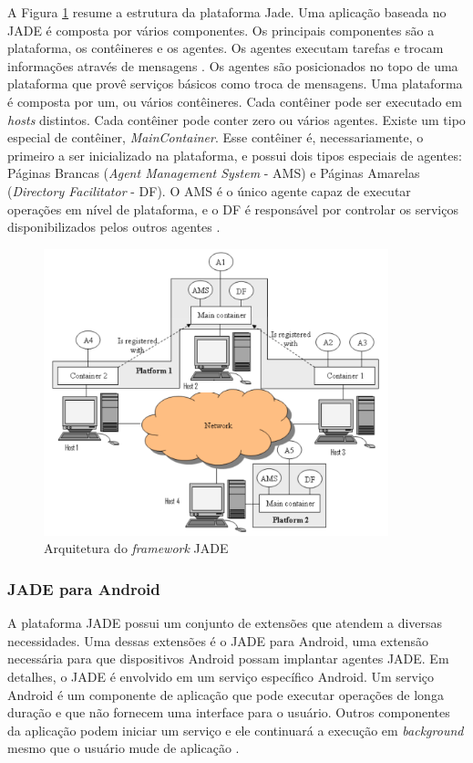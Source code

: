 A Figura \ref{figura:jade} resume a estrutura da plataforma Jade. Uma aplicação
baseada no JADE é composta por vários componentes. Os principais componentes são
a plataforma, os contêineres e os agentes. Os agentes executam tarefas e trocam
informações através de mensagens \cite{fabio2007}. Os agentes são posicionados
no topo de uma plataforma que provê serviços básicos como troca de mensagens.
Uma plataforma é composta por um, ou vários contêineres. Cada contêiner pode ser
executado em \textit{hosts} distintos. Cada contêiner pode conter zero ou vários
agentes. Existe um tipo especial de contêiner, \textit{MainContainer}. Esse
contêiner é, necessariamente, o primeiro a ser inicializado na plataforma, e
possui dois tipos especiais de agentes: Páginas Brancas (\textit{Agent
Management System} - AMS) e Páginas Amarelas (\textit{Directory Facilitator} -
DF). O AMS é o único agente capaz de executar operações em nível de plataforma,
e o DF é responsável por controlar os serviços disponibilizados pelos outros
agentes \cite{jade}.

\begin{figure}[h]
  \centering
  \includegraphics[width=10cm]{figuras/jade_architecture.png}
  \caption{Arquitetura do \textit{framework} JADE \cite{jadeArchitechture}}
  \label{figura:jade}
\end{figure}

\subsubsection{JADE para Android}

A plataforma JADE possui um conjunto de extensões que atendem a diversas
necessidades. Uma dessas extensões é o JADE para Android, uma extensão
necessária para que dispositivos Android possam implantar agentes JADE. Em
detalhes, o JADE é envolvido em um serviço específico Android. Um serviço
Android é um componente de aplicação que pode executar operações de longa
duração e que não fornecem uma interface para o usuário. Outros componentes da
aplicação podem iniciar um serviço e ele continuará a execução em
\textit{background} mesmo que o usuário mude de aplicação \cite{bergenti2014}.

